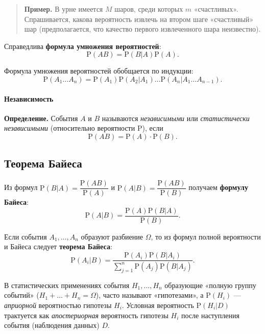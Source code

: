 \documentclass[11pt,a4paper]{article}
\begin{document}
\begin{quote}
\textbf{Пример.} В урне имеется \(M\) шаров, среди которых \(m\)
«счастливых». Спрашивается, какова вероятность извлечь на втором шаге
«счастливый» шар (предполагается, что качество первого извлеченного шара
неизвестно).
\end{quote}

Справедлива \textbf{формула умножения вероятностей}:
\[ \mathrm{P}(AB) = \mathrm{P}(B|A) \mathrm{P}(A). \]

Формула умножения вероятностей обобщается по индукции:
\[ \mathrm{P}(A_1 \dots A_n) = \mathrm{P}(A_1) \mathrm{P}(A_2|A_1) \dots \mathrm{P}(A_n|A_1 \dots A_{n-1}). \]

    \hypertarget{ux43dux435ux437ux430ux432ux438ux441ux438ux43cux43eux441ux442ux44c}{%
\paragraph{Независимость}\label{ux43dux435ux437ux430ux432ux438ux441ux438ux43cux43eux441ux442ux44c}}

\textbf{Определение.} События \(A\) и \(B\) называются
\emph{независимыми} или \emph{статистически независимыми} (относительно
вероятности \(\mathrm{P}\)), если
\[ \mathrm{P}(AB) = \mathrm{P}(A) \cdot \mathrm{P}(B). \]

    \hypertarget{ux442ux435ux43eux440ux435ux43cux430-ux431ux430ux439ux435ux441ux430}{%
\subsection{Теорема
Байеса}\label{ux442ux435ux43eux440ux435ux43cux430-ux431ux430ux439ux435ux441ux430}}

    Из формул \(\mathrm{P}(B|A) = \dfrac{\mathrm{P}(AB)}{\mathrm{P}(A)}\) и
\(\mathrm{P}(A|B) = \dfrac{\mathrm{P}(AB)}{\mathrm{P}(B)}\) получаем
\textbf{формулу Байеса}:
\[ \mathrm{P}(A|B) = \dfrac{\mathrm{P}(A) \mathrm{P}(B|A)}{\mathrm{P}(B)}. \]

Если события \(A_1, \dots, A_n\) образуют разбиение \(\Omega\), то из
формул полной вероятности и Байеса следует \textbf{теорема Байеса}:
\[ \mathrm{P}(A_i|B) = \frac{\mathrm{P}(A_i) \mathrm{P}(B|A_i)}{\sum_{j=1}^{n} \mathrm{P}(A_j) \mathrm{P}(B|A_j)}. \]

    В статистических применениях события \(H_1, \dots, H_n\) образующие
«полную группу событий» (\(H_1 + \dots + H_n = \Omega\)), часто называют
«гипотезами», а \(\mathrm{P}(H_i)\) --- \emph{априорной} вероятностью
гипотезы \(H_i\). Условная вероятность \(\mathrm{P}(H_i|D)\) трактуется
как \emph{апостериорная} вероятность гипотезы \(H_i\) после наступления
события (наблюдения данных) \(D\).
\end{document}
